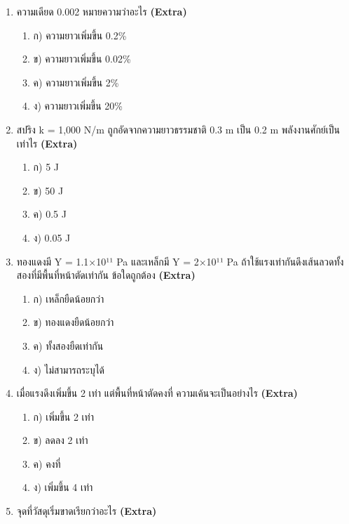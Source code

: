 \documentclass[12pt]{article}
\begin{document}
\begin{enumerate}[label=\arabic*.]
\begin{enumerate}[label=)]
\item ก) 0.025 m
\item ข) 0.25 m
\item ค) 0.0025 m
\item ง) 0.05 m
\end{enumerate}
\item ความเดียด 0.002 หมายความว่าอะไร \hfill \textbf{\small (Extra)}
\begin{enumerate}[label=)]
\item ก) ความยาวเพิ่มขึ้น 0.2\%
\item ข) ความยาวเพิ่มขึ้น 0.02\%
\item ค) ความยาวเพิ่มขึ้น 2\%
\item ง) ความยาวเพิ่มขึ้น 20\%
\end{enumerate}
\item สปริง k = 1,000 N/m ถูกอัดจากความยาวธรรมชาติ 0.3 m เป็น 0.2 m พลังงานศักย์เป็นเท่าไร \hfill \textbf{\small (Extra)}
\begin{enumerate}[label=)]
\item ก) 5 J
\item ข) 50 J
\item ค) 0.5 J
\item ง) 0.05 J
\end{enumerate}
\item ทองแดงมี Y = 1.1×10¹¹ Pa และเหล็กมี Y = 2×10¹¹ Pa ถ้าใช้แรงเท่ากันดึงเส้นลวดทั้งสองที่มีพื้นที่หน้าตัดเท่ากัน ข้อใดถูกต้อง \hfill \textbf{\small (Extra)}
\begin{enumerate}[label=)]
\item ก) เหล็กยืดน้อยกว่า
\item ข) ทองแดงยืดน้อยกว่า
\item ค) ทั้งสองยืดเท่ากัน
\item ง) ไม่สามารถระบุได้
\end{enumerate}
\item เมื่อแรงดึงเพิ่มขึ้น 2 เท่า แต่พื้นที่หน้าตัดคงที่ ความเค้นจะเป็นอย่างไร \hfill \textbf{\small (Extra)}
\begin{enumerate}[label=)]
\item ก) เพิ่มขึ้น 2 เท่า
\item ข) ลดลง 2 เท่า
\item ค) คงที่
\item ง) เพิ่มขึ้น 4 เท่า
\end{enumerate}
\item จุดที่วัสดุเริ่มขาดเรียกว่าอะไร \hfill \textbf{\small (Extra)}
\begin{enumerate}[label=)]

\end{enumerate}
\end{enumerate}
\end{document}
